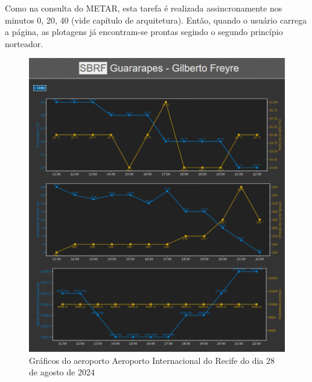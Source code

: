 Como na consulta do METAR, esta tarefa é realizada assincronamente nos 
minutos 0, 20, 40 (vide capítulo de arquitetura). Então, quando o usuário carrega a 
página, as plotagens já encontram-se prontas segindo o segundo princípio norteador.

\begin{figure}[ht]
    \begin{center}
    \includegraphics[width=400pt]{img/plots-SBRF.png}
    \caption{Gráficos do aeroporto Aeroporto Internacional do Recife do dia 28 de agosto de 2024}
    \label{fig:sbrf-plot}
    \end{center}
\end{figure}